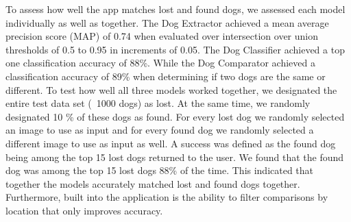 \documentclass{article}
\begin{document}
	To assess how well the app matches lost and found dogs, we assessed each model individually as well as together.  The Dog Extractor achieved a mean average precision score (MAP) of 0.74 when evaluated over intersection over union thresholds of 0.5 to 0.95 in increments of 0.05.  The Dog Classifier achieved a top one classification accuracy of 88\%.  While the Dog Comparator achieved a classification accuracy of 89\% when determining if two dogs are the same or different.  To test how well all three models worked together, we designated the entire test data set (~1000 dogs) as lost.  At the same time, we randomly designated 10 \% of these dogs as found.  For every lost dog we randomly selected an image to use as input and for every found dog we randomly selected a different image to use as input as well.   A success was defined as the found dog being among the top 15 lost dogs returned to the user.  We found that the found dog was among the top 15 lost dogs 88\% of the time.  This indicated that together the models accurately matched lost and found dogs together.  Furthermore, built into the application is the ability to filter comparisons by location that only improves accuracy.

\newpage



\end{document}
